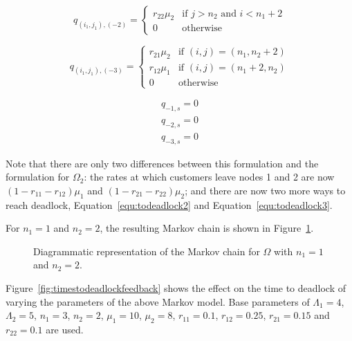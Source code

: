 \documentclass{article}
\numberwithin{equation}{section}
\begin{document}
\begin{equation}\label{equ:todeadlock3}
  q_{(i_1, j_1), (-2)} = \left\{
  \begin{array}{rr}
    r_{22}\mu_2 & \text{if } j > n_2 \text{ and } i < n_1 + 2 \\
    0 & \text{otherwise}
  \end{array}
  \right.
\end{equation}

\begin{equation}\label{eqn:2nssfB}
  q_{(i_1, j_1), (-3)} = \left\{
  \begin{array}{rr}
    r_{21}\mu_2 & \text{if } (i, j) = (n_1, n_2 + 2) \\
    r_{12}\mu_1 & \text{if } (i, j) = (n_1 + 2, n_2) \\
    0 & \text{otherwise}
  \end{array}
  \right.
\end{equation}

\begin{align}
  q_{-1, s} = 0 \\
  q_{-2, s} = 0 \\
  q_{-3, s} = 0
\end{align}

Note that there are only two differences between this formulation and the formulation for $\Omega_2$: the rates at which customers leave nodes 1 and 2 are now $(1-r_{11}-r_{12})\mu_1$ and $(1-r_{21}-r_{22})\mu_2$; and there are now two more ways to reach deadlock, Equation~\ref{equ:todeadlock2} and Equation~\ref{equ:todeadlock3}.

For $n_1 = 1$ and $n_2 = 2$, the resulting Markov chain is shown in Figure~\ref{fig:2nodeMCfeedback}.

\begin{figure}[!htbp]
    \begin{center}
    
    \end{center}
    \caption{Diagrammatic representation of the Markov chain for $\Omega$ with $n_1=1$ and $n_2=2$.}
    \label{fig:2nodeMCfeedback}
\end{figure}

Figure~\ref{fig:timestodeadlockfeedback} shows the effect on the time to deadlock of varying the parameters of the above Markov model.
Base parameters of $\Lambda_1 = 4$, $\Lambda_2 = 5$, $n_1 = 3$, $n_2 = 2$, $\mu_1 = 10$, $\mu_2 = 8$, $r_{11} = 0.1$, $r_{12} = 0.25$, $r_{21} = 0.15$ and $r_{22} = 0.1$ are used.
\end{document}
